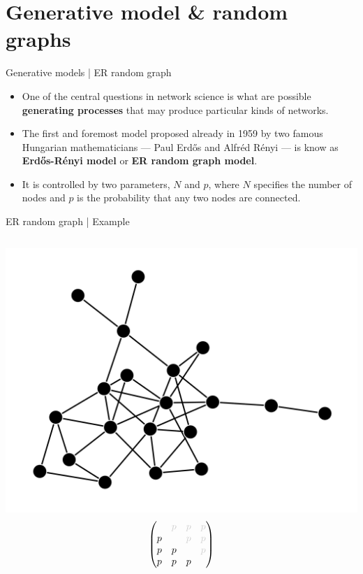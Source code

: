 \documentclass[
    hyperref={colorlinks,linkcolor=blue,urlcolor=blue,citecolor=blue}
]{beamer}
\newcommand{\gray}[1]{\textcolor{black!20}{#1}}
\begin{document}
\section{Generative model \& random graphs}

\begin{frame}{Generative models | ER random graph}
\begin{itemize}
    \item<1-> One of the central questions in network science is what are possible
    \textbf{generating processes} that may produce particular kinds of networks.
    \item<2-> The first and foremost model proposed already in 1959 by two
    famous Hungarian mathematicians --- Paul Erdős and Alfréd Rényi ---
    is know as \textbf{Erdős-Rényi model} or \textbf{ER random graph model}.
    \item<3-> It is controlled by two parameters, $N$ and $p$, where $N$
    specifies the number of nodes and $p$ is the probability that any two nodes
    are connected.
\end{itemize}
\end{frame}

\begin{frame}{ER random graph | Example}
\begin{columns}
    \centering
    \includegraphics[width=\textwidth]{overview/er_random_graph-1.png}
    \centering
    \[
        \begin{pmatrix}
             & \gray{p} & \gray{p} & \gray{p} \\
            p &  & \gray{p} & \gray{p} \\
            p & p &  & \gray{p} \\
            p & p & p &  \\
        \end{pmatrix}
    \]
\end{columns}
\end{frame}
\end{document}
